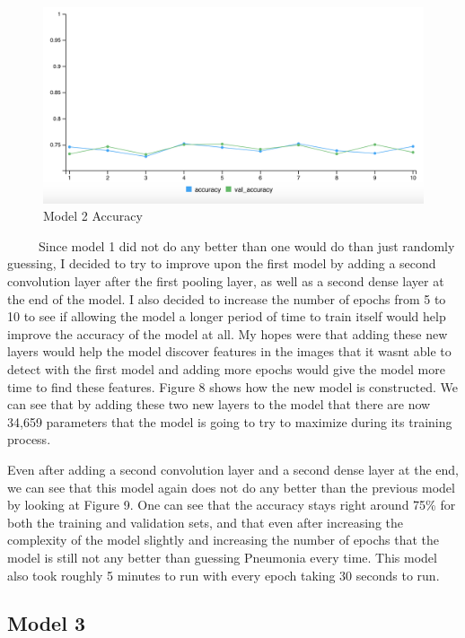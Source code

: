 \documentclass[12pt]{article}
\begin{document}
\begin{figure}

{\centering \includegraphics[width=0.75\linewidth,height=0.25\textheight]{images/model2out} 

}

\caption{Model 2 Accuracy}\label{fig:sample-fig9}
\end{figure}

~~~~~Since model 1 did not do any better than one would do than just
randomly guessing, I decided to try to improve upon the first model by
adding a second convolution layer after the first pooling layer, as well
as a second dense layer at the end of the model. I also decided to
increase the number of epochs from 5 to 10 to see if allowing the model
a longer period of time to train itself would help improve the accuracy
of the model at all. My hopes were that adding these new layers would
help the model discover features in the images that it wasnt able to
detect with the first model and adding more epochs would give the model
more time to find these features. Figure 8 shows how the new model is
constructed. We can see that by adding these two new layers to the model
that there are now 34,659 parameters that the model is going to try to
maximize during its training process.

Even after adding a second convolution layer and a second dense layer at
the end, we can see that this model again does not do any better than
the previous model by looking at Figure 9. One can see that the accuracy
stays right around 75\% for both the training and validation sets, and
that even after increasing the complexity of the model slightly and
increasing the number of epochs that the model is still not any better
than guessing Pneumonia every time. This model also took roughly 5
minutes to run with every epoch taking 30 seconds to run.

\hypertarget{model-3}{%
\subsection{Model 3}\label{model-3}}
\end{document}

